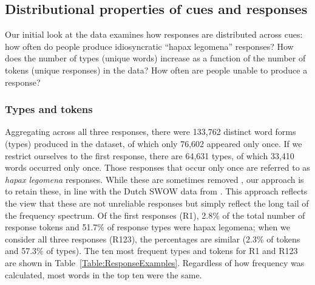 \documentclass[a4paper,doc,natbib,floatsintext]{apa6}
\begin{document}
\subsection{Distributional properties of cues and responses}
Our initial look at the data examines how responses are distributed across cues: how often do people produce idiosyncratic ``hapax legomena'' responses? How does the number of types (unique words) increase as a function of the number of tokens (unique responses) in the data? How often are people unable to produce a response?

\subsubsection{Types and tokens} Aggregating across all three responses, there were 133,762 distinct word forms (types) produced in the dataset, of which only 76,602 appeared only once. If we restrict ourselves to the first response, there are 64,631 types, of which 33,410 words occurred only once. Those responses that occur only once are referred to as \textit{hapax legomena} responses. While these are sometimes removed \citep{Nelson2004}, our approach is to retain these, in line with the Dutch SWOW data from \citet{DeDeyne2013b}. This approach reflects the view that these are not unreliable responses but simply reflect the long tail of the frequency spectrum. Of the first responses (R1), 2.8\% of the total number of response tokens and 51.7\% of response types were hapax legomena; when we consider all three responses (R123), the percentages are similar (2.3\% of tokens and 57.3\% of types). The ten most frequent types and tokens for R1 and R123 are shown in Table~\ref{Table:ResponseExamples}. Regardless of how frequency was calculated, most words in the top ten were the same.
\end{document}
